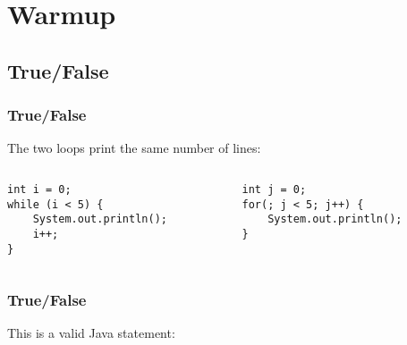 \documentclass[9pt]{beamer}
\title{\themidterm}
\author{\theauthors}
\institute{\theorganization}
\date{\thedate}
\begin{document}

\begin{frame}[fragile]
  \titlepage
\end{frame}

\section{Warmup}
\subsection{True/False}
\begin{frame}[fragile]
  \frametitle{True/False}
  The two loops print the same number of lines:

  \begin{columns}
    \begin{column}{0.5\textwidth}
      \begin{lstlisting}
int i = 0;
while (i < 5) {
    System.out.println();
    i++;
}
      \end{lstlisting}
    \end{column}
    \begin{column}{0.5\textwidth}
      \begin{lstlisting}
int j = 0;
for(; j < 5; j++) {
    System.out.println();
}
      \end{lstlisting}
    \end{column}
  \end{columns}

\end{frame}


\begin{frame}[fragile]
  \frametitle{True/False}
  This is a valid Java statement:

  \multiarrayA



\end{frame}
\end{document}
